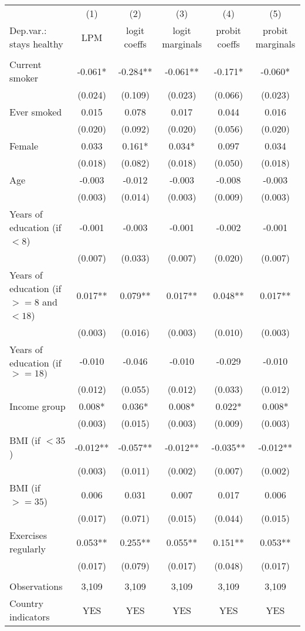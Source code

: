 \begin{tabular}{lccccc} \toprule
 & (1) & (2) & (3) & (4) & (5) \\
Dep.var.: stays healthy & LPM & logit coeffs & logit marginals & probit coeffs & probit marginals \\ 
\midrule
 &  &  &  &  &  \\
Current smoker & -0.061* & -0.284** & -0.061** & -0.171* & -0.060* \\
 & (0.024) & (0.109) & (0.023) & (0.066) & (0.023) \\
Ever smoked & 0.015 & 0.078 & 0.017 & 0.044 & 0.016 \\
 & (0.020) & (0.092) & (0.020) & (0.056) & (0.020) \\
Female & 0.033 & 0.161* & 0.034* & 0.097 & 0.034 \\
 & (0.018) & (0.082) & (0.018) & (0.050) & (0.018) \\
Age & -0.003 & -0.012 & -0.003 & -0.008 & -0.003 \\
 & (0.003) & (0.014) & (0.003) & (0.009) & (0.003) \\
Years of education (if $<8$) & -0.001 & -0.003 & -0.001 & -0.002 & -0.001 \\
 & (0.007) & (0.033) & (0.007) & (0.020) & (0.007) \\
Years of education (if $>=8$ and $<18$) & 0.017** & 0.079** & 0.017** & 0.048** & 0.017** \\
 & (0.003) & (0.016) & (0.003) & (0.010) & (0.003) \\
Years of education (if $>=18) $ & -0.010 & -0.046 & -0.010 & -0.029 & -0.010 \\
 & (0.012) & (0.055) & (0.012) & (0.033) & (0.012) \\
Income group & 0.008* & 0.036* & 0.008* & 0.022* & 0.008* \\
 & (0.003) & (0.015) & (0.003) & (0.009) & (0.003) \\
BMI (if $<35$) & -0.012** & -0.057** & -0.012** & -0.035** & -0.012** \\
 & (0.003) & (0.011) & (0.002) & (0.007) & (0.002) \\
BMI (if $>=35$) & 0.006 & 0.031 & 0.007 & 0.017 & 0.006 \\
 & (0.017) & (0.071) & (0.015) & (0.044) & (0.015) \\
Exercises regularly & 0.053** & 0.255** & 0.055** & 0.151** & 0.053** \\
 & (0.017) & (0.079) & (0.017) & (0.048) & (0.017) \\
 &  &  &  &  &  \\
\midrule
Observations & 3,109 & 3,109 & 3,109 & 3,109 & 3,109 \\
 Country indicators & YES & YES & YES & YES & YES \\ 
 \bottomrule

\end{tabular}
